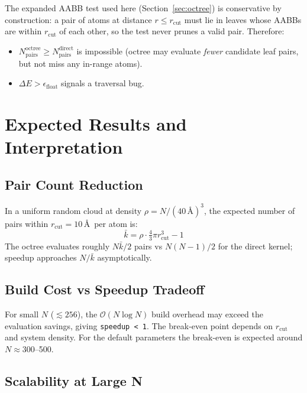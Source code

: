 \documentclass[11pt,a4paper]{article}
\theoremstyle{definition}
\theoremstyle{plain}
\newcommand{\Nq}{N_{\mathrm{pairs}}}
\newcommand{\OnlogN}{\mathcal{O}(N \log N)}
\newcommand{\rcut}{r_{\mathrm{cut}}}
\begin{document}
The expanded AABB test used here (Section~\ref{sec:octree}) is conservative
by construction: a pair of atoms at distance $r \leq \rcut$ must lie in
leaves whose AABBs are within $\rcut$ of each other, so the test never prunes
a valid pair.  Therefore:

\begin{itemize}
  \item $\Nq^{\mathrm{octree}} \geq \Nq^{\mathrm{direct}}$ is impossible
	(octree may evaluate \emph{fewer} candidate leaf pairs, but not miss any
	in-range atoms).
  \item $\Delta E > \epsilon_{\mathrm{float}}$ signals a traversal bug.
\end{itemize}

\section{Expected Results and Interpretation}
\label{sec:results}

\subsection{Pair Count Reduction}

In a uniform random cloud at density $\rho = N / (40\,\text{\AA})^3$, the
expected number of pairs within $\rcut = 10$\,\AA\ per atom is:
\begin{equation}
  \bar{k} = \rho \cdot \tfrac{4}{3}\pi\rcut^3 - 1
\end{equation}
The octree evaluates roughly $N\bar{k}/2$ pairs vs $N(N-1)/2$ for the
direct kernel; speedup approaches $N / \bar{k}$ asymptotically.

\subsection{Build Cost vs Speedup Tradeoff}

For small $N$ ($\lesssim 256$), the $\OnlogN$ build overhead may exceed the
evaluation savings, giving \texttt{speedup < 1}.  The break-even point
depends on $\rcut$ and system density.  For the default parameters the
break-even is expected around $N \approx 300$–500.

\subsection{Scalability at Large N}
\end{document}
